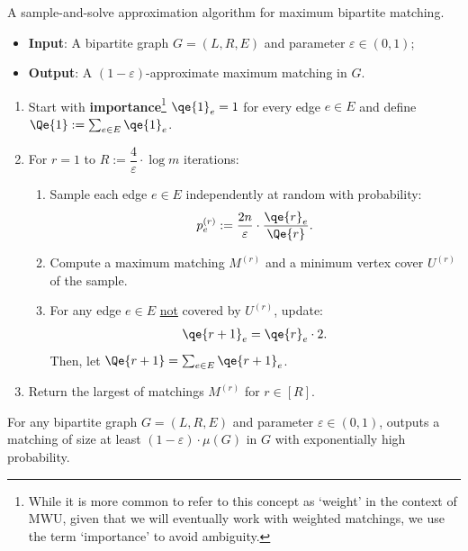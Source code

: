 \documentclass{theoretics}
\newcommand{\eps}{\varepsilon}
\begin{document}
\begin{Algorithm}\label{alg:bipartite}
A sample-and-solve approximation algorithm for maximum bipartite matching. 

\begin{itemize}
	\item \textbf{Input}: A bipartite graph $G=(L,R,E)$ and parameter $\eps \in (0,1)$; 
	\item \textbf{Output}: A $(1-\eps)$-approximate maximum matching in $G$. 
\end{itemize}
	\begin{enumerate}
	\item Start with \textbf{importance}\footnote{While it is more common to refer to this concept as `weight' in the context of MWU, given that we will eventually work with weighted matchings, we use
	the term `importance' to avoid ambiguity.} $\qe{1}_e = 1$ for every edge $e \in E$ and define $\Qe{1} := \sum_{e \in E} \qe{1}_e$. 

	\item For $r=1$ to $R := \dfrac{4}{\eps} \cdot \log{m}$ iterations: 
	\begin{enumerate}[leftmargin=5pt]
	\item Sample each edge $e \in E$ independently at random with probability:
	\begin{align}
		p^{(r)}_e := {\frac{2n}{\eps} \cdot \frac{\qe{r}_e}{\Qe{r}}}. \label{eq:pe-bipartite}
	\end{align}
	\item\label{line:2} Compute a maximum matching $M^{(r)}$ and a minimum vertex cover $U^{(r)}$ of the sample. 
	\item For any edge $e \in E$ \underline{not} covered by $U^{(r)}$, update: 
	\begin{align}
		\qe{r+1}_e = \qe{r}_e \cdot 2. \label{eq:qe-bipartite}
	\end{align}
	Then, let $\Qe{r+1} = \sum_{e \in E} \qe{r+1}_e$. 
	\end{enumerate}
	\item Return the largest of matchings $M^{(r)}$ for $r \in [R]$. 

	\end{enumerate}
\end{Algorithm}

\begin{theorem}\label{thm:alg-bipartite}
	For any bipartite graph $G=(L,R,E)$ and parameter $\eps \in (0,1)$,  outputs a matching of size at least $(1-\eps) \cdot \mu(G)$ in $G$ with exponentially high probability. 
\end{theorem}
\end{document}
